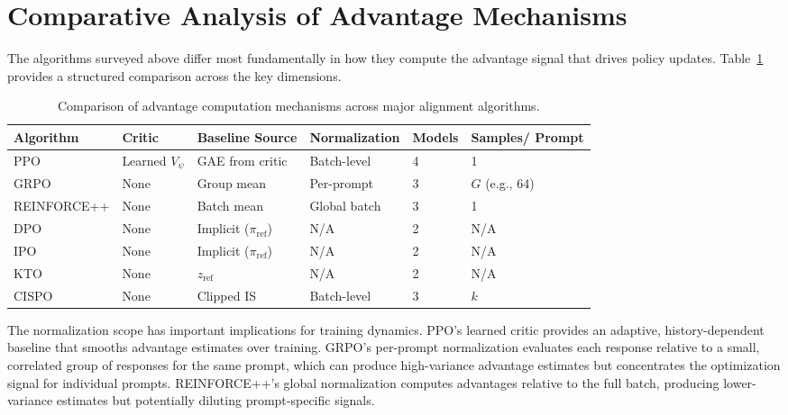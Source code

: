 \documentclass[12pt]{article}
\begin{document}
\section{Comparative Analysis of Advantage Mechanisms}

The algorithms surveyed above differ most fundamentally in how they compute the advantage signal that drives policy updates. Table~\ref{tab:advantage} provides a structured comparison across the key dimensions.

\begin{table}[h]
\centering
\small
\caption{Comparison of advantage computation mechanisms across major alignment algorithms.}
\label{tab:advantage}
\begin{tabular}{@{}p{2.5cm}p{2cm}p{2.5cm}p{2cm}p{1.5cm}p{1.5cm}@{}}
\toprule
\textbf{Algorithm} & \textbf{Critic} & \textbf{Baseline Source} & \textbf{Normalization} & \textbf{Models} & \textbf{Samples/ Prompt} \\
\midrule
PPO & Learned $V_\psi$ & GAE from critic & Batch-level & 4 & 1 \\
GRPO & None & Group mean & Per-prompt & 3 & $G$ (e.g., 64) \\
REINFORCE++ & None & Batch mean & Global batch & 3 & 1 \\
DPO & None & Implicit ($\pi_{\text{ref}}$) & N/A & 2 & N/A \\
IPO & None & Implicit ($\pi_{\text{ref}}$) & N/A & 2 & N/A \\
KTO & None & $z_{\text{ref}}$ & N/A & 2 & N/A \\
CISPO & None & Clipped IS & Batch-level & 3 & $k$ \\
\bottomrule
\end{tabular}
\end{table}

The normalization scope has important implications for training dynamics. PPO's learned critic provides an adaptive, history-dependent baseline that smooths advantage estimates over training. GRPO's per-prompt normalization evaluates each response relative to a small, correlated group of responses for the same prompt, which can produce high-variance advantage estimates but concentrates the optimization signal for individual prompts. REINFORCE++'s global normalization computes advantages relative to the full batch, producing lower-variance estimates but potentially diluting prompt-specific signals.
\end{document}
